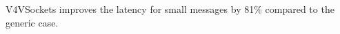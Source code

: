 \documentclass[a0paper,portrait,final]{baposter}
\begin{document}
\begin{poster}
{%
\begin{multicols}{2}

\hspace{0.5em}

\hspace{0.5em}

\hspace{0.5em}


V4VSockets improves the latency for small messages by 81\% compared to the
generic case. 



\end{multicols}}
\end{poster}
\end{document}
